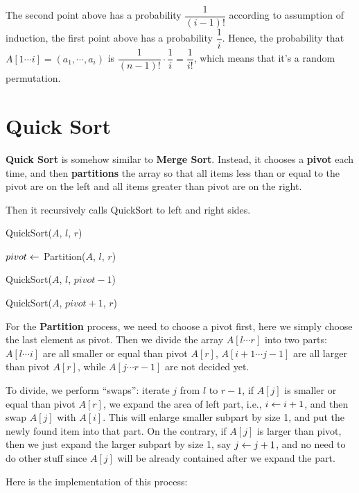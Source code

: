 \documentclass[11pt, a4paper]{COMP3711}
\begin{document}
\begin{spacing}{1.5}
    The second point above has a probability $\dfrac{1}{(i-1)!}$ according 
    to assumption of induction, the first point above has a probability 
    $\dfrac{1}{i}$. Hence, the probability that $A[1\cdots i]=(a_1,\cdots,a_i)$
    is $\dfrac{1}{(n-1)!}\cdot \dfrac{1}{i}=\dfrac{1}{i!}$, which 
    means that it's a random permutation.

    \section{Quick Sort}

    {\bf Quick Sort} is somehow similar to {\bf Merge Sort}. Instead, 
    it chooses a {\bf pivot} each time, and then {\bf partitions}
    the array so that all items less than or equal to the pivot are 
    on the left and all items greater than pivot are 
    on the right.

    Then it recursively calls QuickSort to left and right sides.

    \begin{algorithm*}
        \caption{QuickSort($A$, $l$, $r$)}

        $pivot\leftarrow $ Partition($A$, $l$, $r$)

        QuickSort($A$, $l$, $pivot - 1$)\qquad {}

        QuickSort($A$, $pivot+1$, $r$)\qquad {}
    \end{algorithm*}

    For the {\bf Partition} process, we need to choose a pivot first, 
    here we simply choose the last element as pivot. 
    Then we divide the array $A[l\cdots r]$ into two parts: 
    $A[l\cdots i]$ are all smaller or equal than pivot $A[r]$, $A[i+1\cdots j-1]$
    are all larger than pivot $A[r]$, while $A[j\cdots r-1]$ 
    are not decided yet.

    To divide, we perform ``swaps'': iterate $j$ from $l$ to $r-1$,
    if $A[j]$ is smaller or equal than pivot $A[r]$, we expand 
    the area of left part, i.e., $i\leftarrow i+1$, and then swap 
    $A[j]$ with $A[i]$. This will enlarge smaller subpart by size 1, 
    and put the newly found item into that part.
    On the contrary, if $A[j]$ is larger than pivot, then we 
    just expand the larger subpart by size 1, say $j\leftarrow j+1$,
    and no need to do other stuff since $A[j]$ will be already 
    contained after we expand the part.

    Here is the implementation of this process: 


\end{spacing}
\end{document}
